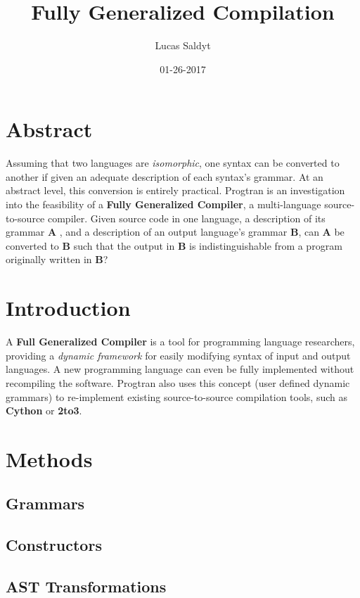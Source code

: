 \documentclass{article}
\title{Fully Generalized Compilation}
\date{01-26-2017}
\author{Lucas Saldyt}
\begin{document}
\maketitle
{}
\newpage
{}

\section{Abstract}

Assuming that two languages are \textit{isomorphic}, one syntax can be converted to another if given an adequate description of each syntax's grammar.
At an abstract level, this conversion is entirely practical. 
Progtran is an investigation into the feasibility of a \textbf{Fully Generalized Compiler}, a multi-language source-to-source compiler. 
Given source code in one language, a description of its grammar \textbf{A} , and a description of an output language's grammar \textbf{B}, can \textbf{A} be converted to \textbf{B} such that the output in \textbf{B} is indistinguishable from a program originally written in \textbf{B}?

\section{Introduction}

A \textbf{Full Generalized Compiler} is a tool for programming language researchers, providing a \textit{dynamic framework} for easily modifying syntax of input and output languages. 
A new programming language can even be fully implemented without recompiling the software. 
Progtran also uses this concept (user defined dynamic grammars) to re-implement existing source-to-source compilation tools, such as \textbf{Cython} or \textbf{2to3}.

\section{Methods}
\subsection{Grammars}
\subsection{Constructors}
\subsection{AST Transformations}
\end{document}
